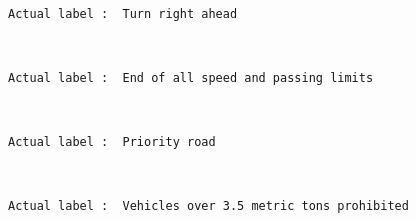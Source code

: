 \documentclass[11pt]{article}
\begin{document}
    \begin{center}
    \end{center}
    { \hspace*{\fill} \\}
    
    \begin{Verbatim}[commandchars=\\\{\}]
Actual label :  Turn right ahead

    \end{Verbatim}

    \begin{center}
    \end{center}
    { \hspace*{\fill} \\}
    
    \begin{Verbatim}[commandchars=\\\{\}]
Actual label :  End of all speed and passing limits

    \end{Verbatim}

    \begin{center}
    \end{center}
    { \hspace*{\fill} \\}
    
    \begin{Verbatim}[commandchars=\\\{\}]
Actual label :  Priority road

    \end{Verbatim}

    \begin{center}
    \end{center}
    { \hspace*{\fill} \\}
    
    \begin{Verbatim}[commandchars=\\\{\}]
Actual label :  Vehicles over 3.5 metric tons prohibited

    \end{Verbatim}
\end{document}
